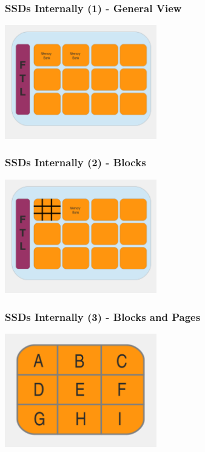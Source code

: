 \documentclass{beamer}
\begin{document}
\begin{frame}
  \frametitle{SSDs Internally (1) - General View}
  \begin{center}
  \includegraphics[width=250px]{principles_1.png}
  \end{center}
\end{frame}

\begin{frame}
  \frametitle{SSDs Internally (2) - Blocks}
  \begin{center}
  \includegraphics[width=250px]{principles_2.png}
  \end{center}
\end{frame}

\begin{frame}
  \frametitle{SSDs Internally (3) - Blocks and Pages}
  \begin{center}
  \includegraphics[width=250px]{principles_3.png}
  \end{center}
\end{frame}
\end{document}
